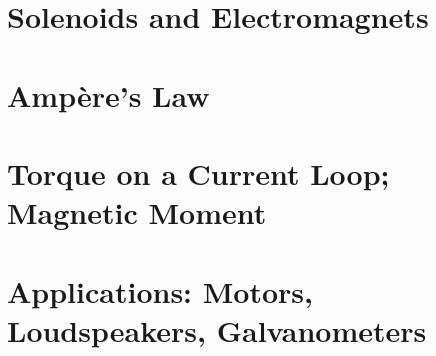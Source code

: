 \documentclass{elegantpaper}
\begin{document}
\begin{multicols}{3}
\section{Solenoids and Electromagnets}
\section{Ampère’s Law}
\section{Torque on a Current Loop; Magnetic Moment}
\section{Applications: Motors, Loudspeakers, Galvanometers}

\end{multicols}
\end{document}
